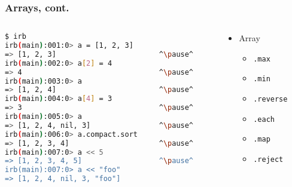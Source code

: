 \begin{frame}[fragile]\frametitle{Arrays, cont.}

\begin{columns}[c] 

\begin{column}{7cm}
\begin{lstlisting}[language=bash, escapechar={^}]
$ irb
irb(main):001:0> a = [1, 2, 3]
=> [1, 2, 3]                        ^\pause^
irb(main):002:0> a[2] = 4
=> 4                                ^\pause^
irb(main):003:0> a
=> [1, 2, 4]                        ^\pause^
irb(main):004:0> a[4] = 3
=> 3                                ^\pause^
irb(main):005:0> a
=> [1, 2, 4, nil, 3]                ^\pause^
irb(main):006:0> a.compact.sort
=> [1, 2, 3, 4]                     ^\pause^
irb(main):007:0> a << 5
=> [1, 2, 3, 4, 5]                  ^\pause^
irb(main):007:0> a << "foo"
=> [1, 2, 4, nil, 3, "foo"]           
\end{lstlisting}
\end{column}

\pause

\begin{column}{4cm}
\begin{itemize}

\item Array
\begin{itemize}

\item \texttt{.max}
\item \texttt{.min}
\item \texttt{.reverse}

\item \texttt{.each}
\item \texttt{.map}
\item \texttt{.reject}

\end{itemize}

\end{itemize}
\end{column}

\end{columns}

\end{frame}





